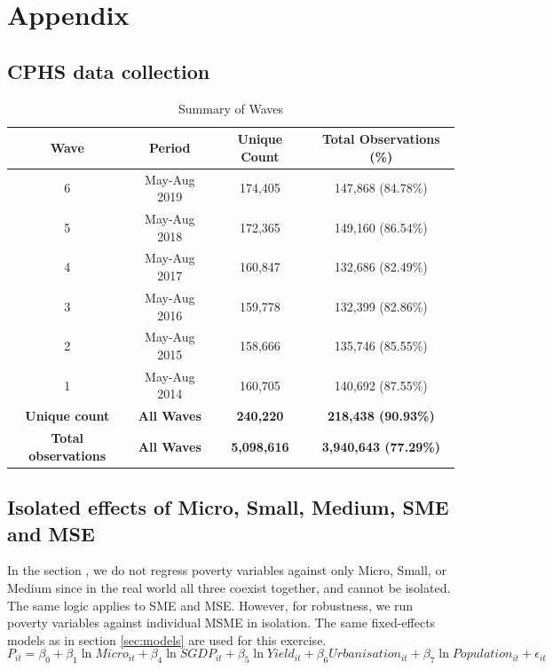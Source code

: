 \documentclass [12pt]{article}
\begin{document}
\newpage
{}
\appendix 
\section{Appendix} \label{sec:appendix}
\subsection*{CPHS data collection }
\begin{table}[htbp]
    \centering
    \caption{Summary of Waves}
    \begin{tabular}{cccc}
        \toprule
        \textbf{Wave} & \textbf{Period} & \textbf{Unique Count} & \textbf{Total Observations (\%)} \\
        \midrule
        
        6 & May-Aug 2019 & 174,405 & 147,868 (84.78\%) \\
        5 & May-Aug 2018 & 172,365 & 149,160 (86.54\%) \\
        4 & May-Aug 2017 & 160,847 & 132,686 (82.49\%) \\
        3  & May-Aug 2016 & 159,778 & 132,399 (82.86\%) \\
        2  & May-Aug 2015 & 158,666 & 135,746 (85.55\%) \\

        1  & May-Aug 2014 & 160,705 & 140,692 (87.55\%) \\

        \hline
        \textbf{Unique count} & \textbf{All Waves} & \textbf{240,220} & \textbf{218,438 (90.93\%)} \\
        \textbf{Total observations} & \textbf{All Waves} & \textbf{5,098,616} & \textbf{3,940,643 (77.29\%)} \\
        \bottomrule
    \end{tabular}
\end{table}

\subsection*{Isolated effects of Micro, Small, Medium, SME and MSE}

\text In the section , we do not regress poverty variables against only Micro, Small, or Medium since in the real world all three coexist together, and cannot be isolated. The same logic applies to SME and MSE. However, for robustness, we run poverty variables against individual MSME in isolation. The same fixed-effects models as in section \ref{sec:models} are used for this exercise. 
\begin{equation}\label{7}
   {P_{it}} = \beta_0 + \beta_1\ln{Micro}_{it} + \beta_4\ln{SGDP_{it}} + \beta_5\ln{Yield_{it}} + \beta_6Urbanisation_{it}  + \beta_7\ln{Population_{it}}+ \epsilon_{it}
\end{equation}
\end{document}
